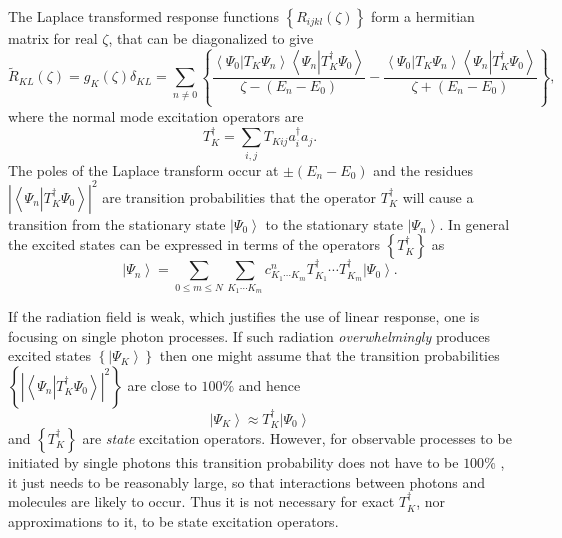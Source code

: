 \documentclass[aps,preprint]{revtex4}%
\begin{document}
The Laplace transformed response functions $\left\{  R_{ijkl}\left(
\zeta\right)  \right\}  $ form a hermitian matrix for real $\zeta$, that can
be diagonalized to give
\begin{equation}
\tilde{R}_{KL}\left(  \zeta\right)  =g_{K}\left(  \zeta\right)  \delta
_{KL}=\sum_{n\neq0}\left\{  \frac{\left\langle \Psi_{0}\left\vert T_{K}%
\Psi_{n}\right.  \right\rangle \left\langle \Psi_{n}\left\vert T_{K}^{\dagger
}\Psi_{0}\right.  \right\rangle }{\zeta-\left(  E_{n}-E_{0}\right)  }%
-\frac{\left\langle \Psi_{0}\left\vert T_{K}\Psi_{n}\right.  \right\rangle
\left\langle \Psi_{n}\left\vert T_{K}^{\dagger}\Psi_{0}\right.  \right\rangle
}{\zeta+\left(  E_{n}-E_{0}\right)  }\right\}  ,
\end{equation}
where the normal mode excitation operators are
\begin{equation}
T_{K}^{\dagger}=\sum_{i,j}T_{Kij}a_{i}^{\dagger}a_{j}.
\end{equation}
The poles of the Laplace transform occur at $\pm\left(  E_{n}-E_{0}\right)  $
and the residues $\left\vert \left\langle \Psi_{n}\left\vert T_{K}^{\dagger
}\Psi_{0}\right.  \right\rangle \right\vert ^{2}$ are transition probabilities
that the operator $T_{K}^{\dagger}$ will cause a transition from the
stationary state $\left\vert \Psi_{0}\right\rangle $ to the stationary state
$\left\vert \Psi_{n}\right\rangle $. In general the excited states can be
expressed in terms of the operators $\left\{  T_{K}^{\dagger}\right\}  $ as
\begin{equation}
\left\vert \Psi_{n}\right\rangle =\sum_{0\leq m\leq N}\sum_{K_{1}\cdots K_{m}%
}c_{K_{1}\cdots K_{m}}^{n}T_{K_{1}}^{\dagger}\cdots T_{K_{m}}^{\dagger
}\left\vert \Psi_{0}\right\rangle . \label{state_exp}%
\end{equation}


If the radiation field is weak, which justifies the use of linear response,
one is focusing on single photon processes. If such radiation
\emph{overwhelmingly} produces excited states $\left\{  \left\vert \Psi
_{K}\right\rangle \right\}  $ then one might assume that the transition
probabilities $\left\{  \left\vert \left\langle \Psi_{n}\left\vert
T_{K}^{\dagger}\Psi_{0}\right.  \right\rangle \right\vert ^{2}\right\}  $ are
close to $100\%$ and hence
\begin{equation}
\left\vert \Psi_{K}\right\rangle \approx T_{K}^{\dagger}\left\vert \Psi
_{0}\right\rangle
\end{equation}
and $\left\{  T_{K}^{\dagger}\right\}  $ are \emph{state} excitation
operators. However, for observable processes to be initiated by single photons
this transition probability does not have to be $100\%$ , it just needs to be
reasonably large, so that interactions between photons and molecules are
likely to occur. Thus it is not necessary for exact $T_{K}^{\dagger}$, nor
approximations to it, to be state excitation operators.
\end{document}
